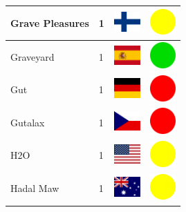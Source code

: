 \documentclass[12pt, a4paper, twoside]{report}
\begin{document}
\begin{center}
\begin{longtable}{|p{5cm}|p{2cm}|p{2cm}|p{2cm}|}
			Grave Pleasures & 1 & \includegraphics[width=1cm]{4x3/fi} & \includegraphics[width=1cm]{likes/m} \\ \hline
			Graveyard & 1 & \includegraphics[width=1cm]{4x3/es} & \includegraphics[width=1cm]{likes/y} \\ \hline
			Gut & 1 & \includegraphics[width=1cm]{4x3/de} & \includegraphics[width=1cm]{likes/n} \\ \hline
			Gutalax & 1 & \includegraphics[width=1cm]{4x3/cz} & \includegraphics[width=1cm]{likes/n} \\ \hline
			H2O & 1 & \includegraphics[width=1cm]{4x3/us} & \includegraphics[width=1cm]{likes/m} \\ \hline
			Hadal Maw & 1 & \includegraphics[width=1cm]{4x3/au} & \includegraphics[width=1cm]{likes/m} \\ \hline

\end{longtable}
\end{center}
\end{document}
